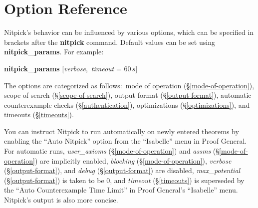 \documentclass[a4paper,12pt]{article}
\begin{document}
\section{Option Reference}
\label{option-reference}

\def\flushitem#1{\item[]\noindent\kern-\leftmargin \textbf{#1}}
\def\qty#1{$\left<\textit{#1}\right>$}
\def\qtybf#1{$\mathbf{\left<\textbf{\textit{#1}}\right>}$}
\def\optrue#1#2{\flushitem{\textit{#1} $\bigl[$= \qtybf{bool}$\bigr]$\quad [\textit{true}]\hfill (neg.: \textit{#2})}\nopagebreak\\[\parskip]}
\def\opfalse#1#2{\flushitem{\textit{#1} $\bigl[$= \qtybf{bool}$\bigr]$\quad [\textit{false}]\hfill (neg.: \textit{#2})}\nopagebreak\\[\parskip]}
\def\opsmart#1#2{\flushitem{\textit{#1} $\bigl[$= \qtybf{bool\_or\_smart}$\bigr]$\quad [\textit{smart}]\hfill (neg.: \textit{#2})}\nopagebreak\\[\parskip]}
\def\opnodefault#1#2{\flushitem{\textit{#1} = \qtybf{#2}} \nopagebreak\\[\parskip]}
\def\opdefault#1#2#3{\flushitem{\textit{#1} = \qtybf{#2}\quad [\textit{#3}]} \nopagebreak\\[\parskip]}
\def\oparg#1#2#3{\flushitem{\textit{#1} \qtybf{#2} = \qtybf{#3}} \nopagebreak\\[\parskip]}
\def\opargbool#1#2#3{\flushitem{\textit{#1} \qtybf{#2} $\bigl[$= \qtybf{bool}$\bigr]$\hfill (neg.: \textit{#3})}\nopagebreak\\[\parskip]}
\def\opargboolorsmart#1#2#3{\flushitem{\textit{#1} \qtybf{#2} $\bigl[$= \qtybf{bool\_or\_smart}$\bigr]$\hfill (neg.: \textit{#3})}\nopagebreak\\[\parskip]}

Nitpick's behavior can be influenced by various options, which can be specified
in brackets after the \textbf{nitpick} command. Default values can be set
using \textbf{nitpick\_\allowbreak params}. For example:

\prew
\textbf{nitpick\_params} [\textit{verbose}, \,\textit{timeout} = 60$\,s$]
\postw

The options are categorized as follows:\ mode of operation
(\S\ref{mode-of-operation}), scope of search (\S\ref{scope-of-search}), output
format (\S\ref{output-format}), automatic counterexample checks
(\S\ref{authentication}), optimizations
(\S\ref{optimizations}), and timeouts (\S\ref{timeouts}).

You can instruct Nitpick to run automatically on newly entered theorems by
enabling the ``Auto Nitpick'' option from the ``Isabelle'' menu in Proof
General. For automatic runs, \textit{user\_axioms} (\S\ref{mode-of-operation})
and \textit{assms} (\S\ref{mode-of-operation}) are implicitly enabled,
\textit{blocking} (\S\ref{mode-of-operation}), \textit{verbose}
(\S\ref{output-format}), and \textit{debug} (\S\ref{output-format}) are
disabled, \textit{max\_potential} (\S\ref{output-format}) is taken to be 0, and
\textit{timeout} (\S\ref{timeouts}) is superseded by the ``Auto Counterexample
Time Limit'' in Proof General's ``Isabelle'' menu. Nitpick's output is also more
concise.
\end{document}

